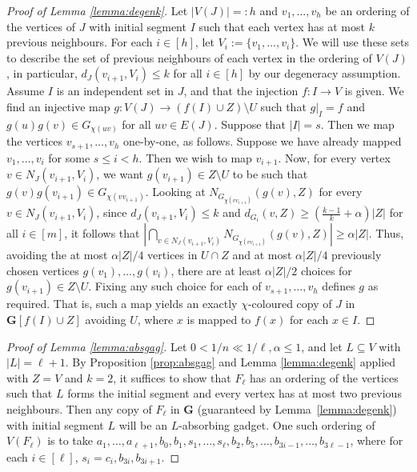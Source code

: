 \documentclass[11pt, dvipsnames]{amsart}
\theoremstyle{plain}
\theoremstyle{definition}
\newcommand{\mbf}[1]{\mathbf{#1}}
\newcommand{\sm}{\setminus}
\newcommand{\aA}{\alpha}
\begin{document}
\begin{proof}[Proof of Lemma \ref{lemma:degenk}]
Let $|V(J)|=:h$ and $v_1, \ldots, v_h$ be an ordering of the vertices of $J$ with initial segment $I$ such that each vertex has at most $k$ previous neighbours. For each $i \in [h]$, let $V_i:=\{v_1, \ldots, v_i\}$.  We will use these sets to describe the set of previous neighbours of each vertex in the ordering of $V(J)$, in particular, $ d_J(v_{i+1},V_i)\le k$ for all $i\in [h]$ by our degeneracy assumption. Assume $I$ is an independent set in $J$, and that the injection $f:I \rightarrow V$ is given. 
We find an injective map $g:V(J) \rightarrow (f(I)\cup Z)\sm U$ such that $g|_I=f$ and 
$g(u)g(v)\in G_{\chi(uv)}$ for all $uv\in E(J)$.
Suppose that $|I|=s$. Then we map the vertices $v_{s+1}, \ldots, v_h$ one-by-one, as follows. Suppose we have already mapped $v_{1}, \ldots, v_{i}$ for some $s \leq i < h$. Then we wish to map $v_{i+1}$. Now, for every vertex $v \in N_{J}(v_{i+1},V_i)$, we want $g(v_{i+1})\in Z\sm U$ to be such that $g(v)g(v_{i+1}) \in G_{\chi(vv_{i+1})}$. Looking at $N_{G_{\chi(vv_{i+1})}}(g(v),Z)$ for every $v \in N_{J}(v_{i+1},V_i)$, since $ d_{J}(v_{i+1},V_i) \leq k$ and $ d_{G_i}(v,Z) \geq (\frac{k-1}{k}+\alpha)|Z|$ for all $i \in [m]$, it follows that $|\bigcap_{v \in N_{J}(v_{i+1},V_i)} N_{G_{\chi(vv_{i+1})}}(g(v),Z)| \geq \alpha |Z|$. 
Thus, avoiding the at most $\alpha|Z|/4$ vertices in $U \cap Z$ and at most $\alpha|Z|/4$ previously chosen vertices $g(v_1),\ldots,g(v_i)$, there are at least $\alpha|Z|/2$ choices for $g(v_{i+1})\in Z\sm U$. 
Fixing any such choice for each of $v_{s+1}, \ldots, v_h$ defines $g$ as required. 
That is, such a map yields an exactly $\chi$-coloured copy of $J$ in $\mbf G[f(I)\cup Z]$ avoiding $U$, where $x$ is mapped to $f(x)$ for each $x \in I$. 
\end{proof}

\begin{proof}[Proof of Lemma \ref{lemma:absgag}]
Let $0<1/n \ll 1/\ell,\aA \leq 1$, and let $L \subseteq V$ with $|L|=\ell+1$. By Proposition \ref{prop:absgag} and Lemma \ref{lemma:degenk} applied with $Z=V$ and $k=2$, it suffices to show that $F_\ell$ has an ordering of the vertices such that $L$ forms the initial segment and every vertex has at most two previous neighbours. Then any copy of $F_\ell$ in $\mbf G$ (guaranteed by Lemma~\ref{lemma:degenk}) with initial segment $L$ will be an $L$-absorbing gadget. One such ordering of $V(F_\ell)$ is to take $a_1,\ldots,a_{\ell+1},b_0,b_1,s_1,\ldots,s_{\ell},b_2,b_5,\ldots,b_{3i-1},\ldots,b_{3\ell-1}$, where for each $i \in [\ell]$, $s_i=c_i,b_{3i},b_{3i+1}$.
\end{proof}
\end{document}
